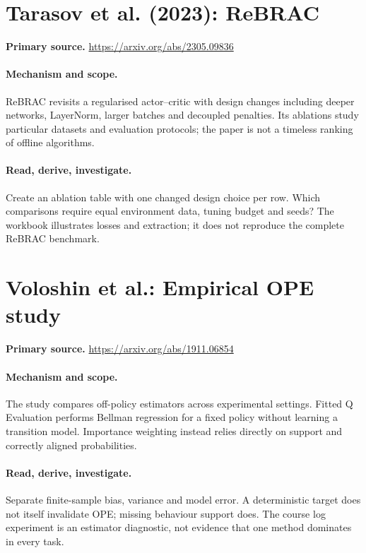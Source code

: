 \documentclass[11pt]{scrartcl}
\begin{document}
\section{Tarasov et al. (2023): ReBRAC}
\noindent\textbf{Primary source.} \url{https://arxiv.org/abs/2305.09836}

\paragraph{Mechanism and scope.} ReBRAC revisits a regularised actor--critic with design changes including deeper networks, LayerNorm, larger batches and decoupled penalties. Its ablations study particular datasets and evaluation protocols; the paper is not a timeless ranking of offline algorithms.

\paragraph{Read, derive, investigate.} Create an ablation table with one changed design choice per row. Which comparisons require equal environment data, tuning budget and seeds? The workbook illustrates losses and extraction; it does not reproduce the complete ReBRAC benchmark.

\section{Voloshin et al.: Empirical OPE study}
\noindent\textbf{Primary source.} \url{https://arxiv.org/abs/1911.06854}

\paragraph{Mechanism and scope.} The study compares off-policy estimators across experimental settings. Fitted Q Evaluation performs Bellman regression for a fixed policy without learning a transition model. Importance weighting instead relies directly on support and correctly aligned probabilities.

\paragraph{Read, derive, investigate.} Separate finite-sample bias, variance and model error. A deterministic target does not itself invalidate OPE; missing behaviour support does. The course log experiment is an estimator diagnostic, not evidence that one method dominates in every task.
\end{document}
